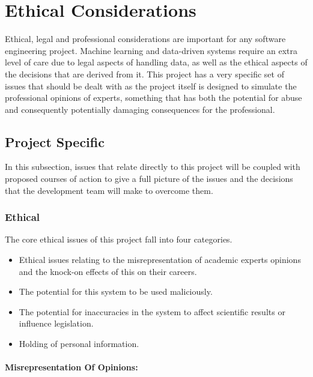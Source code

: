 \documentclass{ecmm427_assignment}
\begin{document}
\section{Ethical Considerations}

 Ethical, legal and professional considerations are important for any
software engineering project. Machine learning and data-driven systems
require an extra level of care due to legal aspects of handling data,
as well as the ethical aspects of the decisions that are derived from
it. This project has a very specific set of issues that should be
dealt with as the project itself is designed to simulate the professional
opinions of experts, something that has both the potential for abuse
and consequently potentially damaging consequences for the professional.

\subsection{Project Specific}

 In this subsection, issues that relate directly to this project will
be coupled with proposed courses of action to give a full picture
of the issues and the decisions that the development team will make
to overcome them. 

\subsubsection{Ethical}

The core ethical issues of this project fall into four categories. 
\begin{itemize}
\item Ethical issues relating to the misrepresentation of academic experts
opinions and the knock-on effects of this on their careers.
\item The potential for this system to be used maliciously.
\item The potential for inaccuracies in the system to affect scientific
results or influence legislation. 
\item Holding of personal information.
\end{itemize}

\paragraph{Misrepresentation Of Opinions:}
\end{document}
